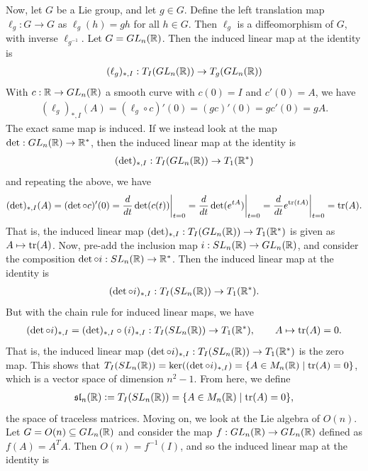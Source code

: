 Now, let $G$ be a Lie group, and let $g \in G$. Define the left translation map $\ell_{g}:G \to G$ as $\ell_{g}(h) = gh$ for all $h \in G$. Then $\ell_{g}$ is a diffeomorphism of $G$, with inverse $\ell_{g^{-1}}$. Let $G = GL_{n}(\mathbb{R})$. Then the induced linear map at the identity is
\begin{align}
    (\ell_{g})_{\ast,I}:T_{I}(GL_{n}(\mathbb{R})) \to T_{g}(GL_{n}(\mathbb{R}))
\end{align}
With $c:\mathbb{R} \to GL_{n}(\mathbb{R})$ a smooth curve with $c(0) = I$ and $c'(0) = A$, we have
\begin{align}
    (\ell_{g})_{\ast,I}(A) = (\ell_{g} \circ c)'(0) = (gc)'(0) = g c'(0) = gA.
\end{align}
The exact same map is induced. If we instead look at the map $\det:GL_{n}(\mathbb{R}) \to \mathbb{R}^{\ast}$, then the induced linear map at the identity is
\begin{align}
    (\det)_{\ast,I}:T_{I}(GL_{n}(\mathbb{R})) \to T_{1}(\mathbb{R}^{\ast})
\end{align}
and repeating the above, we have
\begin{align}
    (\det)_{\ast,I}(A) = (\det \circ c)'(0) = \frac{d}{dt} \det(c(t))\bigg|_{t=0} = \frac{d}{dt} \det(e^{tA})\bigg|_{t=0} = \frac{d}{dt} e^{\operatorname{tr}(tA)}\bigg|_{t=0} = \operatorname{tr}(A).
\end{align}
That is, the induced linear map $(\det)_{\ast,I}:T_{I}(GL_{n}(\mathbb{R})) \to T_{1}(\mathbb{R}^{\ast})$ is given as $A \mapsto \operatorname{tr}(A)$. Now, pre-add the inclusion map $i:SL_{n}(\mathbb{R}) \to GL_{n}(\mathbb{R})$, and consider the composition $\det \circ i:SL_{n}(\mathbb{R}) \to \mathbb{R}^{\ast}$. Then the induced linear map at the identity is
\begin{align}
    (\det \circ i)_{\ast,I}:T_{I}(SL_{n}(\mathbb{R})) \to T_{1}(\mathbb{R}^{\ast}).
\end{align}
But with the chain rule for induced linear maps, we have
\begin{align}
    (\det \circ i)_{\ast,I} = (\det)_{\ast,I} \circ (i)_{\ast,I}:T_{I}(SL_{n}(\mathbb{R})) \to T_{1}(\mathbb{R}^{\ast}), \qquad A \mapsto \operatorname{tr}(A) = 0.
\end{align}
That is, the induced linear map $(\det \circ i)_{\ast,I}:T_{I}(SL_{n}(\mathbb{R})) \to T_{1}(\mathbb{R}^{\ast})$ is the zero map. This shows that $T_{I}(SL_{n}(\mathbb{R})) = \ker((\det \circ i)_{\ast,I}) = \{A \in M_{n}(\mathbb{R}) \mid \operatorname{tr}(A) = 0\}$, which is a vector space of dimension $n^{2}-1$. From here, we define
\begin{align}
    \mathfrak{sl}_{n}(\mathbb{R}) \vcentcolon= T_{I}(SL_{n}(\mathbb{R})) = \{A \in M_{n}(\mathbb{R}) \mid \operatorname{tr}(A) = 0\},
\end{align}
the space of traceless matrices. Moving on, we look at the Lie algebra of $O(n)$. Let $G = O(n) \subseteq GL_{n}(\mathbb{R})$ and consider the map $f:GL_{n}(\mathbb{R}) \to GL_{n}(\mathbb{R})$ defined as $f(A) = A^{T}A$. Then $O(n) = f^{-1}(I)$, and so the induced linear map at the identity is
